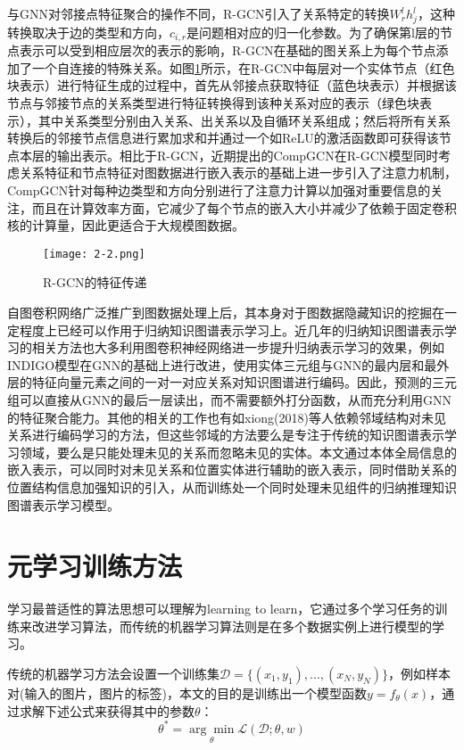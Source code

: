 与GNN对邻接点特征聚合的操作不同，R-GCN引入了关系特定的转换\(W_{r}^{l}h_{j}^{l}\)，这种转换取决于边的类型和方向，\(c_{i,r}\)是问题相对应的归一化参数。为了确保第l层的节点表示可以受到相应层次的表示的影响，R-GCN在基础的图关系上为每个节点添加了一个自连接的特殊关系。如图\ref{fig:2-2}所示，在R-GCN中每层对一个实体节点（红色块表示）进行特征生成的过程中，首先从邻接点获取特征（蓝色块表示）并根据该节点与邻接节点的关系类型进行特征转换得到该种关系对应的表示（绿色块表示），其中关系类型分别由入关系、出关系以及自循环关系组成；然后将所有关系转换后的邻接节点信息进行累加求和并通过一个如ReLU的激活函数即可获得该节点本层的输出表示。相比于R-GCN，近期提出的CompGCN在R-GCN模型同时考虑关系特征和节点特征对图数据进行嵌入表示的基础上进一步引入了注意力机制，CompGCN针对每种边类型和方向分别进行了注意力计算以加强对重要信息的关注，而且在计算效率方面，它减少了每个节点的嵌入大小并减少了依赖于固定卷积核的计算量，因此更适合于大规模图数据。
\begin{figure}
  \centering
  \texttt{[image: 2-2.png]}
  \caption{R-GCN的特征传递}
  \label{fig:2-2}
\end{figure}

自图卷积网络广泛推广到图数据处理上后，其本身对于图数据隐藏知识的挖掘在一定程度上已经可以作用于归纳知识图谱表示学习上。近几年的归纳知识图谱表示学习的相关方法也大多利用图卷积神经网络进一步提升归纳表示学习的效果，例如INDIGO\cite{liu2021indigo}模型在GNN的基础上进行改进，使用实体三元组与GNN的最内层和最外层的特征向量元素之间的一对一对应关系对知识图谱进行编码。因此，预测的三元组可以直接从GNN的最后一层读出，而不需要额外打分函数，从而充分利用GNN的特征聚合能力。其他的相关的工作也有如xiong(2018)等人依赖邻域结构对未见关系进行编码学习的方法，但这些邻域的方法要么是专注于传统的知识图谱表示学习领域，要么是只能处理未见的关系而忽略未见的实体。本文通过本体全局信息的嵌入表示，可以同时对未见关系和位置实体进行辅助的嵌入表示，同时借助关系的位置结构信息加强知识的引入，从而训练处一个同时处理未见组件的归纳推理知识图谱表示学习模型。

\section{元学习训练方法}
学习最普适性的算法思想可以理解为learning to learn，它通过多个学习任务的训练来改进学习算法，而传统的机器学习算法则是在多个数据实例上进行模型的学习。

传统的机器学习方法会设置一个训练集\(\mathcal{D} = \{(x_{1},y_{1}),...,(x_{N},y_{N})\}\)，例如样本对(输入的图片，图片的标签)，本文的目的是训练出一个模型函数\(y = f_{\theta}(x)\)，通过求解下述公式来获得其中的参数\(\theta\)：
\begin{equation}
  \theta^{*} = \underset { \theta } { \operatorname { arg } \operatorname { min } }\mathcal{L}(\mathcal{D};\theta,w) \label{eq:2-6}
\end{equation}

